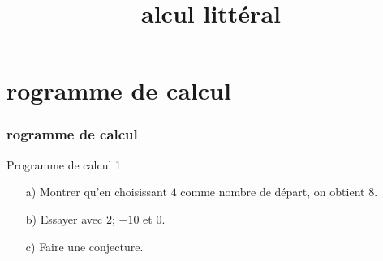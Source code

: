 \documentclass{beamer}
\title{\rmfamily{\textsc{C}}alcul littéral}
\begin{document}
\frame{\titlepage}

\section{rogramme de calcul}

\begin{frame}
  \frametitle{rogramme de calcul}
  \begin{exampleblock}{Programme de calcul 1}
    
    \begin{multicols}{2}
      
      \begin{enumerate}
      \item[a)] Montrer qu'en choisissant $4$ comme nombre de départ, on obtient $8$.
      \item[b)] Essayer avec $2$; $-10$ et $0$.
      \item[c)] Faire une conjecture.
      \end{enumerate}
      
    \end{multicols}
  \end{exampleblock}
\end{frame}
\end{document}
